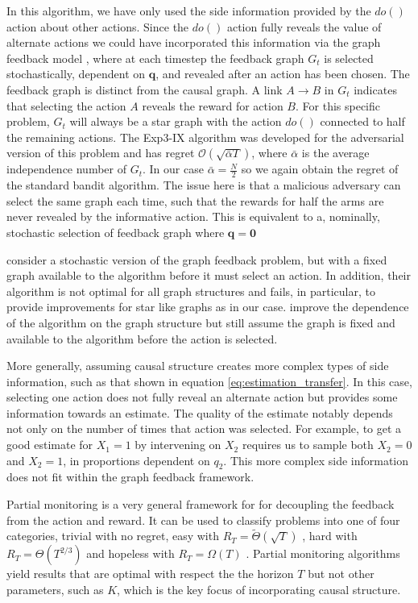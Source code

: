 \documentclass[11pt,a4paper]{article}
\newcommand{\bigo}[1]{\mathcal{O}\left( #1 \right)}
\newcommand{\bigtheta}[1]{\Theta\left( #1 \right)}
\newcommand{\bigthetatilde}[1]{\tilde{\Theta}\left( #1 \right)}
\newcommand{\bigomega}[1]{\Omega\left( #1 \right)}
\begin{document}
In this algorithm, we have only used the side information provided by the $do()$ action about other actions. Since the $do()$ action fully reveals the value of alternate actions we could have incorporated this information via the graph feedback model \cite{}, where at each timestep the feedback graph $G_t$ is selected stochastically, dependent on $\boldsymbol{q}$, and revealed after an action has been chosen. The feedback graph is distinct from the causal graph. A link $A \rightarrow B$ in $G_t$ indicates that selecting the action $A$ reveals the reward for action $B$. For this specific problem, $G_t$ will always be a star graph with the action $do()$ connected to half the remaining actions. The Exp3-IX algorithm \cite{Kocak2014} was developed for the adversarial version of this problem and has regret $\bigo{\sqrt{\bar{\alpha}T}}$, where $\bar{\alpha}$ is the average independence number of $G_t$. In our case $\bar{\alpha} = \frac{N}{2}$ so we again obtain the regret of the standard bandit algorithm. The issue here is that a malicious adversary can select the same graph each time, such that the rewards for half the arms are never revealed by the informative action. This is equivalent to a, nominally, stochastic selection of feedback graph where $\boldsymbol{q} = \boldsymbol{0}$

\cite{Lelarge2012} consider a stochastic version of the graph feedback problem, but with a fixed graph available to the algorithm before it must select an action. In addition, their algorithm is not optimal for all graph structures and fails, in particular, to provide improvements for star like graphs as in our case. \cite{Buccapatnam2014} improve the dependence of the algorithm on the graph structure but still assume the graph is fixed and available to the algorithm before the action is selected. 

More generally, assuming causal structure creates more complex types of side information, such as that shown in equation \ref{eq:estimation_transfer}. In this case, selecting one action does not fully reveal an alternate action but provides some information towards an estimate. The quality of the estimate notably depends not only on the number of times that action was selected. For example, to get a good estimate for $X_1 = 1$ by intervening on $X_2$ requires us to sample both $X_2=0$ and $X_2=1$, in proportions dependent on $q_2$. This more complex side information does not fit within the graph feedback framework.

Partial monitoring is a very general framework for for decoupling the feedback from the action and reward. It can be used to classify problems into one of four categories, trivial with no regret, easy with $R_T = \bigthetatilde{\sqrt{T}}$ , hard with $R_T = \bigtheta{T^{2/3}}$ and hopeless with $R_T = \bigomega{T}$ \cite{Bartok2014}. Partial monitoring algorithms yield results that are optimal with respect the the horizon $T$ but not other parameters, such as $K$, which is the key focus of incorporating causal structure. 
\end{document}
